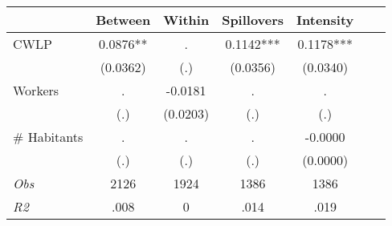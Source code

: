 \begin{tabular}{l*{6}{c}}\hline&\multicolumn{1}{c}{Between}&\multicolumn{1}{c}{Within}&\multicolumn{1}{c}{Spillovers}&\multicolumn{1}{c}{Intensity}\\ \hline 
CWLP & 0.0876** & . & 0.1142*** & 0.1178*** \\
 & (0.0362) & (.) & (0.0356) & (0.0340) \\
Workers & . & -0.0181 & . & . \\
 & (.) & (0.0203) & (.) & (.) \\
\# Habitants & . & . & . & -0.0000 \\
  & (.) & (.) & (.) & (0.0000) \\
\hline \textit{Obs} & 2126 & 1924 & 1386 & 1386  \\ \textit{R2} & .008 & 0 & .014 & .019 \\ \hline \end{tabular}
